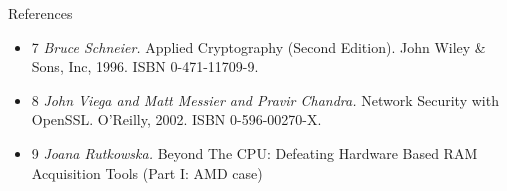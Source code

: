 \documentclass{beamer}
\newenvironment{itemizeframe}[1]
  {\begin{frame}{#1}\startitemizeframe}
  {\stopitemizeframe\end{frame}}
\newcommand\startitemizeframe{\begin{itemize}}
\newcommand\stopitemizeframe{\end{itemize}}
\begin{document}
	\begin{itemizeframe}{References}
		\item[7] \emph{Bruce Schneier.} Applied Cryptography (Second Edition). John Wiley \& Sons,
			Inc, 1996. ISBN 0-471-11709-9.
		\item[8] \emph{John Viega and Matt Messier and Pravir Chandra.} Network Security with
			OpenSSL. O'Reilly, 2002. ISBN 0-596-00270-X.
		\item[9] \emph{Joana Rutkowska.} Beyond The CPU: Defeating Hardware Based RAM Acquisition Tools (Part I: AMD case)
	\end{itemizeframe}
\end{document}
